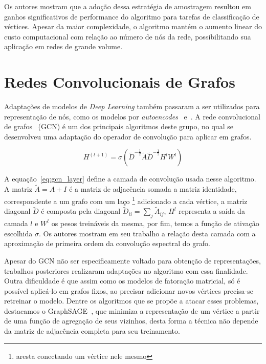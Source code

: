 Os autores mostram que a adoção dessa estratégia de amostragem resultou em
ganhos significativos de performance do algoritmo para tarefas de classificação
de vértices.
Apesar da maior complexidade, o algoritmo mantém o aumento linear do custo
computacional com relação ao número de nós da rede, possibilitando sua aplicação
em redes de grande volume.

\section{Redes Convolucionais de Grafos}

Adaptações de modelos de \textit{Deep Learning} também passaram a ser utilizados
para representação de nós, como os modelos por \textit{autoencodes}~\cite{wang16}
e~\cite{cao16}.
A rede convolucional de grafos~\cite{kipf16} (GCN) é um dos principais algoritmos
deste grupo, no qual se desenvolveu uma adaptação do operador de convolução para
aplicar em grafos.

\begin{equation} \label{eq:gcn_layer}
    H^{(l+1)} = \sigma (\tilde{D}^{-\frac{1}{2}} \tilde{A} \tilde{D}^{-\frac{1}{2}} H^l W^l)
\end{equation}

A equação~\ref{eq:gcn_layer} define a camada de convolução usada nesse
algoritmo.
A matriz $\tilde{A} = A + I$ é a matriz de adjacência somada a matriz
identidade, correspondente a um grafo com um laço \footnote{aresta conectando um
vértice nele mesmo} adicionado a cada vértice, a matriz diagonal $\tilde{D}$ é
composta pela diagonal $\tilde{D}_{ii} = \sum_{j}\tilde{A}_{ij}$, $H^l$
representa a saída da camada $l$ e $W^l$ os pesos treináveis da mesma, por fim,
temos a função de ativação escolhida $\sigma$.
Os autores mostram em seu trabalho a relação desta camada com a aproximação de
primeira ordem da convolução espectral do grafo.

Apesar do GCN não ser especificamente voltado para obtenção de representações,
trabalhos posteriores realizaram adaptações no algoritmo com essa finalidade.
Outra dificuldade é que assim como os modelos de fatoração matricial, só é
possível aplicá-lo em grafos fixos, ao precisar adicionar novos vértices
precisa-se retreinar o modelo.
Dentre os algoritmos que se propõe a atacar esses problemas, destacamos o
GraphSAGE~\cite{hamilton17}, que minimiza a representação de um vértice a partir
de uma função de agregação de seus vizinhos, desta forma a técnica não depende
da matriz de adjacência completa para seu treinamento.
